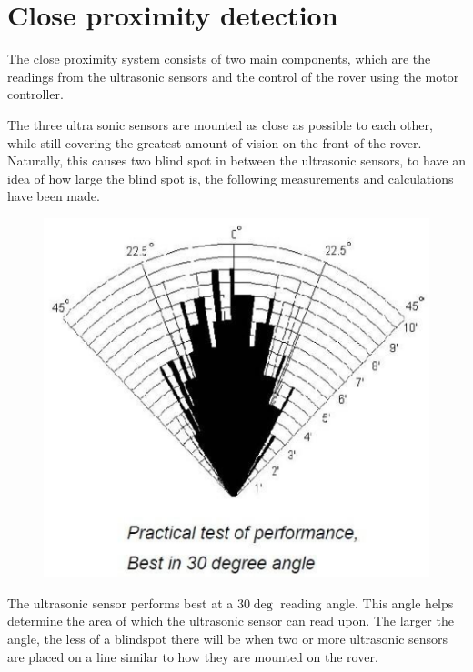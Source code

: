 \clearpage
\section{Close proximity detection}

The close proximity system consists of two main components, which are the readings from the ultrasonic sensors and the control of the rover using the motor controller.


The three ultra sonic sensors are mounted as close as possible to each other, while still covering the greatest amount of vision on the front of the rover. Naturally, this causes two blind spot in between the ultrasonic sensors, to have an idea of how large the blind spot is, the following measurements and calculations have been made.


\begin{figure}[H]
	\centering
	\includegraphics[width=.5\linewidth]{images/hcsr04angle.png}
\end{figure}
The ultrasonic sensor performs best at a $30\deg$ reading angle. This angle helps determine the area of which the ultrasonic sensor can read upon. The larger the angle, the less of a blindspot there will be when two or more ultrasonic sensors are placed on a line similar to how they are mounted on the rover\cite{hcsr40datesheet}.




